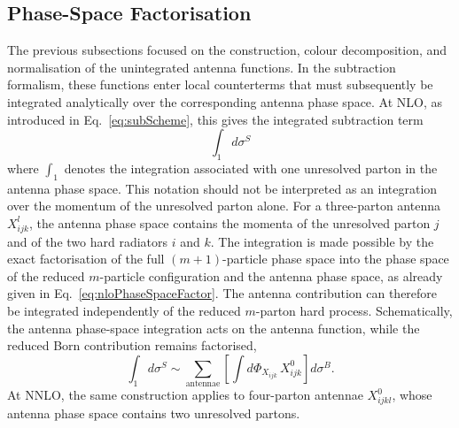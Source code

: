 \fi

\subsection{Phase-Space Factorisation}\label{subsec:phaseSpaceFactor}

The previous subsections focused on the construction, colour decomposition,
and normalisation of the unintegrated antenna functions. In the subtraction
formalism, these functions enter local counterterms that must subsequently be
integrated analytically over the corresponding antenna phase space. At NLO, as
introduced in Eq.~\eqref{eq:subScheme}, this gives the integrated subtraction
term
\begin{equation}\label{eq:integratedSubNLO}
    \int_1 d\sigma^S
\end{equation}
where $\int_1$ denotes the integration associated with one unresolved parton
in the antenna phase space. This notation should not be interpreted as an
integration over the momentum of the unresolved parton alone. For a
three-parton antenna $X_{ijk}^l$, the antenna phase space contains the momenta
of the unresolved parton $j$ and of the two hard radiators $i$ and $k$. The
integration is made possible by the exact factorisation of the full
$(m+1)$-particle phase space into the phase space of the reduced $m$-particle
configuration and the antenna phase space, as already given in
Eq.~\eqref{eq:nloPhaseSpaceFactor}. The antenna contribution can therefore be
integrated independently of the reduced $m$-parton hard process. Schematically,
the antenna phase-space integration acts on the antenna function, while the
reduced Born contribution remains factorised,
\begin{equation}
    \int_1 d\sigma^S\sim\sum_\text{antennae}\left[\int d\Phi_{X_{ijk}}\,X_{ijk}^0\right]d\sigma^B.
\end{equation}
At NNLO, the same construction applies to four-parton antennae $X_{ijkl}^0$,
whose antenna phase space contains two unresolved partons.

